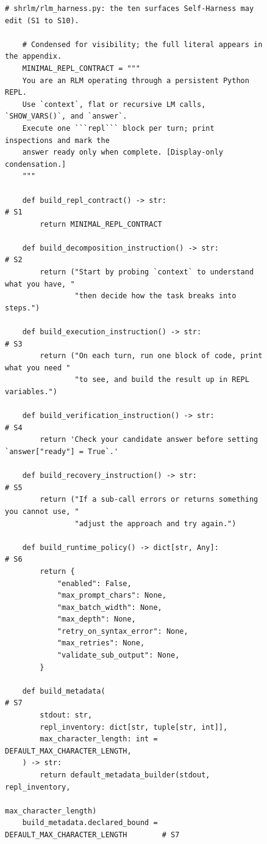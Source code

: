 \begin{figure}[!tbp]
    \centering
    \begin{lstlisting}[style=harness]
    # shrlm/rlm_harness.py: the ten surfaces Self-Harness may edit (S1 to S10).
    
    # Condensed for visibility; the full literal appears in the appendix.
    MINIMAL_REPL_CONTRACT = """
    You are an RLM operating through a persistent Python REPL.
    Use `context`, flat or recursive LM calls, `SHOW_VARS()`, and `answer`.
    Execute one ```repl``` block per turn; print inspections and mark the
    answer ready only when complete. [Display-only condensation.]
    """
    
    def build_repl_contract() -> str:                                    # S1
        return MINIMAL_REPL_CONTRACT
    
    def build_decomposition_instruction() -> str:                        # S2
        return ("Start by probing `context` to understand what you have, "
                "then decide how the task breaks into steps.")
    
    def build_execution_instruction() -> str:                            # S3
        return ("On each turn, run one block of code, print what you need "
                "to see, and build the result up in REPL variables.")
    
    def build_verification_instruction() -> str:                         # S4
        return 'Check your candidate answer before setting `answer["ready"] = True`.'
    
    def build_recovery_instruction() -> str:                             # S5
        return ("If a sub-call errors or returns something you cannot use, "
                "adjust the approach and try again.")
    
    def build_runtime_policy() -> dict[str, Any]:                        # S6
        return {
            "enabled": False,
            "max_prompt_chars": None,
            "max_batch_width": None,
            "max_depth": None,
            "retry_on_syntax_error": None,
            "max_retries": None,
            "validate_sub_output": None,
        }
    
    def build_metadata(                                                  # S7
        stdout: str,
        repl_inventory: dict[str, tuple[str, int]],
        max_character_length: int = DEFAULT_MAX_CHARACTER_LENGTH,
    ) -> str:
        return default_metadata_builder(stdout, repl_inventory,
                                        max_character_length)
    build_metadata.declared_bound = DEFAULT_MAX_CHARACTER_LENGTH        # S7
    

\end{lstlisting}
\end{figure}
